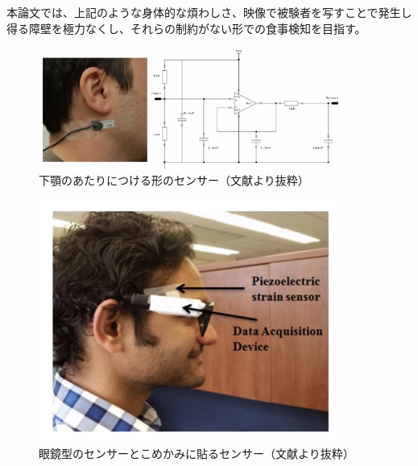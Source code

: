 本論文では、上記のような身体的な煩わしさ、映像で被験者を写すことで発生し得る障壁を極力なくし、それらの制約がない形での食事検知を目指す。

\begin{figure}[htbp]
  \caption{下顎のあたりにつける形のセンサー（文献\cite{detect_food_ingestion_chewing}より抜粋）}
  \label{fig:detect_food_ingestion_chewing}
  \begin{center}
    \includegraphics[bb=0 0 1000 500,width=10cm]{assets/fi_monitor_chewing.png}
  \end{center}
\end{figure}

\begin{figure}[htbp]
  \caption{眼鏡型のセンサーとこめかみに貼るセンサー（文献\cite{real_time_eating_wearable_device_eyeglass}より抜粋）}
  \label{fig:real_time_eating_wearable_device_eyeglass}
  \begin{center}
    \includegraphics[bb=0 0 1000 500,width=10cm]{assets/fi_monitor_eyeglass.png}
  \end{center}
\end{figure}

